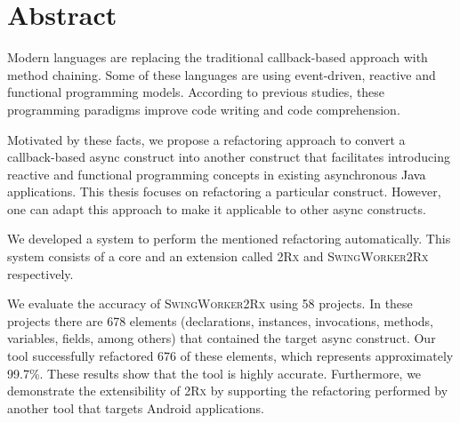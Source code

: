 \documentclass[type=bsc,accentcolor=tud9c]{tudthesis}
\newcommand{\framework}[1]{\textcolor{black}{#1}}
\newcommand{\toolcore}{\textsc{2Rx}}
\newcommand{\toolextension}{\textsc{SwingWorker2Rx}}
\begin{document}

\author{Grebiel José Ifill Brito}
\date{February 2017}

\makethesistitle

\chapter*{Abstract}
Modern languages are replacing the traditional callback-based approach with method chaining. Some of these languages are using event-driven, reactive and functional programming models. According to previous studies, these programming paradigms improve code writing and code comprehension.

Motivated by these facts, we propose a refactoring approach to convert a callback-based async construct into another construct that facilitates introducing reactive and functional programming concepts in existing asynchronous \framework{Java} applications. This thesis focuses on refactoring a particular construct. However, one can adapt this approach to make it applicable to other async constructs.

We developed a system to perform the mentioned refactoring automatically. This system consists of a core and an extension called \toolcore{} and \toolextension{} respectively.

We evaluate the accuracy of \toolextension{} using 58 projects. In these projects there are 678 elements (declarations, instances, invocations, methods, variables, fields, among others) that contained the target async construct. Our tool successfully refactored 676 of these elements, which represents approximately 99.7\%. These results show that the tool is highly accurate. Furthermore, we demonstrate the extensibility of \toolcore{} by supporting the refactoring performed by another tool that targets Android applications.

\tableofcontents
\listoffigures
\listoftables
\listoflistings
\end{document}
